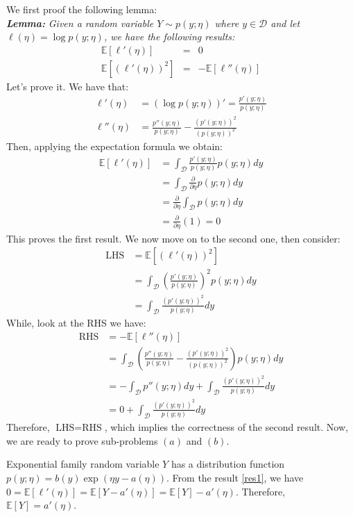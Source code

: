 \begin{answer}
We first proof the following lemma: \\
\textbf{\textit{Lemma:}} \textit{Given a random variable $Y \sim p(y; \eta)$ where $y \in \mathcal{D}$ and let $\ell(\eta) = \log p(y; \eta)$, we have the following results:}
\begin{eqnarray}
	\mathbb{E}[\ell'(\eta)] &=& 0 \label{res1}\\
	\mathbb{E}[(\ell'(\eta))^2] &=& - \mathbb{E}[\ell''(\eta)] \label{res2}
\end{eqnarray}
Let's prove it. We have that:
\begin{align} 
	\ell'(\eta) &= (\log p(y; \eta))' = \frac{p'(y; \eta)}{p(y; \eta)} \\
	\ell''(\eta) &= \frac{p''(y; \eta)}{p(y; \eta)} - \frac{(p'(y; \eta))^2}{(p(y; \eta))^2}
\end{align}
Then, applying the expectation formula we obtain:
\begin{align}
	\mathbb{E}[\ell'(\eta)] &= \int_\mathcal{D} \frac{p'(y; \eta)}{p(y; \eta)} p(y; \eta)dy \\
	&= \int_\mathcal{D} \frac{\partial}{\partial \eta} p(y; \eta) dy \\
	&= \frac{\partial}{\partial \eta} \int_\mathcal{D} p(y; \eta) dy \\
	&= \frac{\partial}{\partial \eta} (1) = 0
\end{align}
This proves the first result. We now move on to the second one, then consider:
\begin{align}
	\text{LHS} &= \mathbb{E}[(\ell'(\eta))^2] \\
	&= \int_\mathcal{D} \left( \frac{p'(y; \eta)}{p(y; \eta)} \right)^2 p(y; \eta) dy \\
	&= \int_\mathcal{D} \frac{(p'(y; \eta))^2}{p(y; \eta)} dy
\end{align}
While, look at the RHS we have:
\begin{align}
	\text{RHS} &= - \mathbb{E}[\ell''(\eta)] \\
	&= \int_\mathcal{D} \left( \frac{p''(y; \eta)}{p(y; \eta)} - \frac{(p'(y; \eta))^2}{(p(y; \eta))^2} \right) p(y; \eta) dy \\
	&= - \int_\mathcal{D} p''(y; \eta) dy +  \int_\mathcal{D} \frac{(p'(y; \eta))^2}{p(y; \eta)} dy \\
	&= 0 + \int_\mathcal{D} \frac{(p'(y; \eta))^2}{p(y; \eta)} dy
\end{align}
Therefore, $\text{LHS} = \text{RHS}$, which implies the correctness of the second result. Now, we are ready to prove sub-problems $(a)$ and $(b)$.

Exponential family random variable $Y$ has a distribution function $p(y; \eta) = b(y) \exp(\eta y - a(\eta))$.
From the result \eqref{res1}, we have $0 = \mathbb{E}[\ell'(\eta)] = \mathbb{E}[Y - a'(\eta)] = \mathbb{E}[Y] - a'(\eta)$. Therefore, $\mathbb{E}[Y] = a'(\eta)$. \\
\end{answer}
